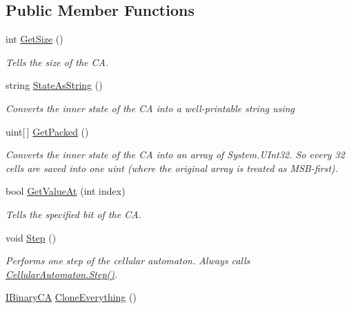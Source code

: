 \subsection*{Public Member Functions}
\begin{DoxyCompactItemize}
\item 
int \hyperlink{interface_cellular_1_1_i_binary_c_a_ae9a650d8dac5a23ebb051b00e2dc3dee}{Get\+Size} ()
\begin{DoxyCompactList}\small\item\em Tells the size of the C\+A. \end{DoxyCompactList}\item 
string \hyperlink{interface_cellular_1_1_i_binary_c_a_ab70ebcefac0ca22dd06661f3316a6c2e}{State\+As\+String} ()
\begin{DoxyCompactList}\small\item\em Converts the inner state of the C\+A into a well-\/printable string using \end{DoxyCompactList}\item 
uint\mbox{[}$\,$\mbox{]} \hyperlink{interface_cellular_1_1_i_binary_c_a_a62f943d92c7aedd121f99940ff12c63e}{Get\+Packed} ()
\begin{DoxyCompactList}\small\item\em Converts the inner state of the C\+A into an array of {\ttfamily System.\+U\+Int32}. So every 32 cells are saved into one uint (where the original array is treated as M\+S\+B-\/first). \end{DoxyCompactList}\item 
bool \hyperlink{interface_cellular_1_1_i_binary_c_a_a809b66186b663b64d85db59237693b52}{Get\+Value\+At} (int index)
\begin{DoxyCompactList}\small\item\em Tells the specified bit of the C\+A. \end{DoxyCompactList}\item 
void \hyperlink{interface_cellular_1_1_i_binary_c_a_a6a04c7374538c49df07efa176e0dd3c3}{Step} ()
\begin{DoxyCompactList}\small\item\em Performs one step of the cellular automaton. Always calls {\ttfamily \hyperlink{class_cellular_1_1_cellular_automaton_aa70848d58015575974bc875ac5a89ae7}{Cellular\+Automaton.\+Step()}}. \end{DoxyCompactList}\item 
\hyperlink{interface_cellular_1_1_i_binary_c_a}{I\+Binary\+C\+A} \hyperlink{interface_cellular_1_1_i_binary_c_a_a0d5610129c1f7aee62d6521ba8268cf9}{Clone\+Everything} ()

\end{DoxyCompactItemize}
